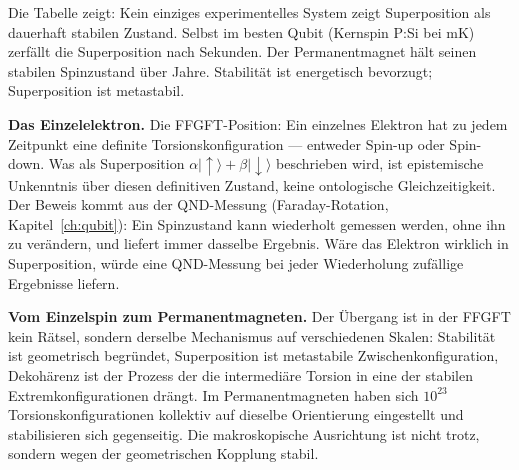 Die Tabelle zeigt: Kein einziges experimentelles System zeigt
Superposition als dauerhaft stabilen Zustand. Selbst im besten Qubit
(Kernspin P:Si bei mK) zerfällt die Superposition nach Sekunden. Der
Permanentmagnet hält seinen stabilen Spinzustand über Jahre. Stabilität
ist energetisch bevorzugt; Superposition ist metastabil.

\textbf{Das Einzelelektron.} Die FFGFT-Position: Ein einzelnes Elektron
hat zu jedem Zeitpunkt eine definite Torsionskonfiguration --- entweder
Spin-up oder Spin-down. Was als Superposition $\alpha|\uparrow\rangle+
\beta|\downarrow\rangle$ beschrieben wird, ist epistemische Unkenntnis
über diesen definitiven Zustand, keine ontologische Gleichzeitigkeit. Der
Beweis kommt aus der QND-Messung (Faraday-Rotation, Kapitel~\ref{ch:qubit}):
Ein Spinzustand kann wiederholt gemessen werden, ohne ihn zu verändern,
und liefert immer dasselbe Ergebnis. Wäre das Elektron wirklich in
Superposition, würde eine QND-Messung bei jeder Wiederholung zufällige
Ergebnisse liefern.

\textbf{Vom Einzelspin zum Permanentmagneten.} Der Übergang ist in der
FFGFT kein Rätsel, sondern derselbe Mechanismus auf verschiedenen Skalen:
Stabilität ist geometrisch begründet, Superposition ist metastabile
Zwischenkonfiguration, Dekohärenz ist der Prozess der die intermediäre
Torsion in eine der stabilen Extremkonfigurationen drängt. Im
Permanentmagneten haben sich $10^{23}$ Torsionskonfigurationen kollektiv
auf dieselbe Orientierung eingestellt und stabilisieren sich gegenseitig.
Die makroskopische Ausrichtung ist nicht trotz, sondern wegen der
geometrischen Kopplung stabil.

